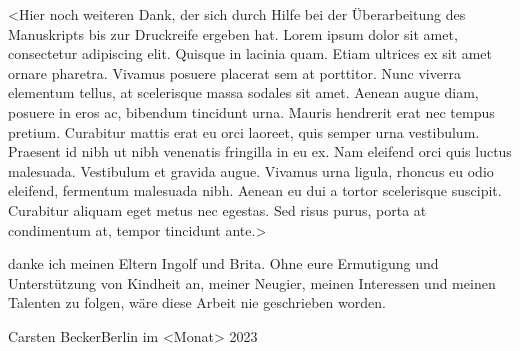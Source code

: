 <Hier noch weiteren Dank, der sich durch Hilfe bei der Überarbeitung des
Manuskripts bis zur Druckreife ergeben hat. Lorem ipsum dolor sit amet,
consectetur adipiscing elit. Quisque in lacinia quam. Etiam ultrices ex sit
amet ornare pharetra. Vivamus posuere placerat sem at porttitor. Nunc viverra
elementum tellus, at scelerisque massa sodales sit amet. Aenean augue diam,
posuere in eros ac, bibendum tincidunt urna. Mauris hendrerit erat nec tempus
pretium. Curabitur mattis erat eu orci laoreet, quis semper urna vestibulum.
Praesent id nibh ut nibh venenatis fringilla in eu ex. Nam eleifend orci quis
luctus malesuada. Vestibulum et gravida augue. Vivamus urna ligula, rhoncus eu
odio eleifend, fermentum malesuada nibh. Aenean eu dui a tortor scelerisque
suscipit. Curabitur aliquam eget metus nec egestas. Sed risus purus, porta at
condimentum at, tempor tincidunt ante.>

 danke ich meinen Eltern Ingolf und Brita. Ohne eure
Ermutigung und Unterstützung von Kindheit an, meiner Neugier, meinen Interessen
und meinen Talenten zu folgen, wäre diese Arbeit nie geschrieben worden.
\bigskip

\noindent%
Carsten Becker\hfill Berlin im <Monat> 2023
